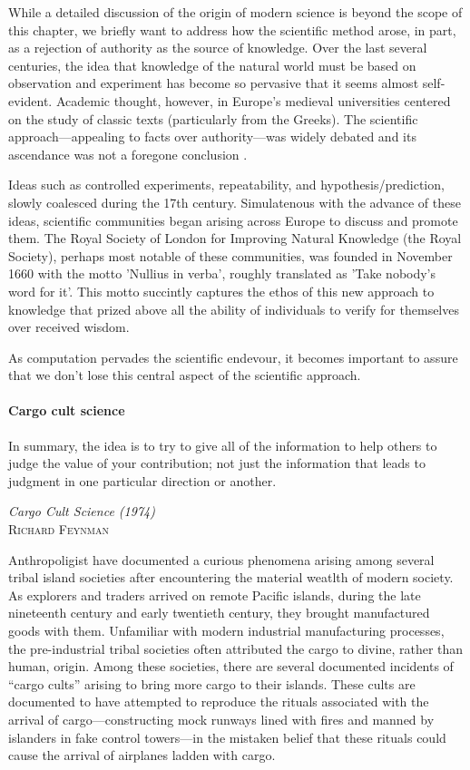 \documentclass[ChapterTOCs,krantz2]{krantz} %
\begin{document}
While a detailed discussion of the origin of modern science is beyond the scope
of this chapter, we briefly want to address how the scientific method arose, in
part, as a rejection of authority as the source of knowledge. Over the last
several centuries, the idea that knowledge of the natural world must be based
on observation and experiment has become so pervasive that it seems almost
self-evident. Academic thought, however, in Europe's medieval universities
centered on the study of classic texts (particularly from the Greeks). The
scientific approach---appealing to facts over authority---was widely debated
and its ascendance was not a foregone conclusion \cite{shapin2011leviathan}.

Ideas such as controlled experiments, repeatability, and hypothesis/prediction,
slowly coalesced during the 17th century.  Simulatenous with the advance of these
ideas, scientific communities began arising across Europe to discuss and promote
them. The Royal Society of London for Improving Natural Knowledge (the Royal Society),
perhaps most notable of these communities, was founded in November 1660 with the motto
'Nullius in verba', roughly translated as 'Take nobody's word for it'. This motto
succintly captures the ethos of this new approach to knowledge that prized above
all the ability of individuals to verify for themselves over received wisdom.

As computation pervades the scientific endevour, it becomes important to assure
that we don't lose this central aspect of the scientific approach.

\paragraph{ {\bf Cargo cult science}}

\setlength{\epigraphrule}{0pt}
\setlength{\epigraphwidth}{.65\textwidth}
\epigraph%
{%
  In summary, the idea is to try to give all of the information to
  help others to judge the value of your contribution; not just the
  information that leads to judgment in one particular direction or
  another.
}%
{\textit{Cargo Cult Science (1974)}\\ \textsc{Richard Feynman} }


Anthropoligist have documented a curious phenomena arising among several tribal
island societies after encountering the material weatlth of modern society. As
explorers and traders arrived on remote Pacific islands, during the late
nineteenth century and early twentieth century, they brought manufactured goods
with them.  Unfamiliar with modern industrial manufacturing processes, the
pre-industrial tribal societies often attributed the cargo to divine, rather
than human, origin. Among these societies, there are several documented
incidents of ``cargo cults'' arising to bring more cargo to their islands.
These cults are documented to have attempted to reproduce the rituals associated
with the arrival of cargo---constructing mock runways lined with fires and manned
by islanders in fake control towers---in the mistaken
belief that these rituals could cause the arrival of airplanes ladden with
cargo.
\end{document}
